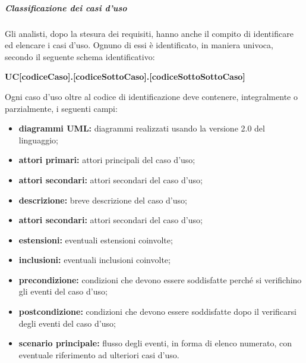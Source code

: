 				\subparagraph{Classificazione dei casi d'uso}
					Gli analisti, dopo la stesura dei requisiti, hanno anche il compito di identificare ed elencare i casi d’uso. Ognuno di essi è identificato, in maniera univoca, secondo il seguente schema identificativo:
					\begin{center}
						\textbf{UC[codiceCaso].[codiceSottoCaso].[codiceSottoSottoCaso]}
					\end{center}
					Ogni caso d'uso oltre al codice di identificazione deve contenere, integralmente o parzialmente, i seguenti campi:
					\begin{itemize}
						\item \textbf{diagrammi UML:} diagrammi realizzati usando la versione 2.0 del linguaggio;
						\item \textbf{attori primari:} attori principali del caso d’uso; 
						\item \textbf{attori secondari:} attori secondari del caso d’uso;
						\item \textbf{descrizione:} breve descrizione del caso d'uso;
						\item \textbf{attori secondari:} attori secondari del caso d’uso;
						\item \textbf{estensioni:} eventuali estensioni coinvolte;
						\item \textbf{inclusioni:} eventuali inclusioni coinvolte;
						\item \textbf{precondizione:} condizioni che devono essere soddisfatte perché si verifichino gli eventi del caso d’uso;
						\item \textbf{postcondizione:} condizioni che devono essere soddisfatte dopo il verificarsi degli eventi del caso d’uso;
						\item \textbf{scenario principale:} flusso degli eventi, in forma di elenco numerato, con eventuale riferimento ad ulteriori casi d’uso.
					\end{itemize}
				
